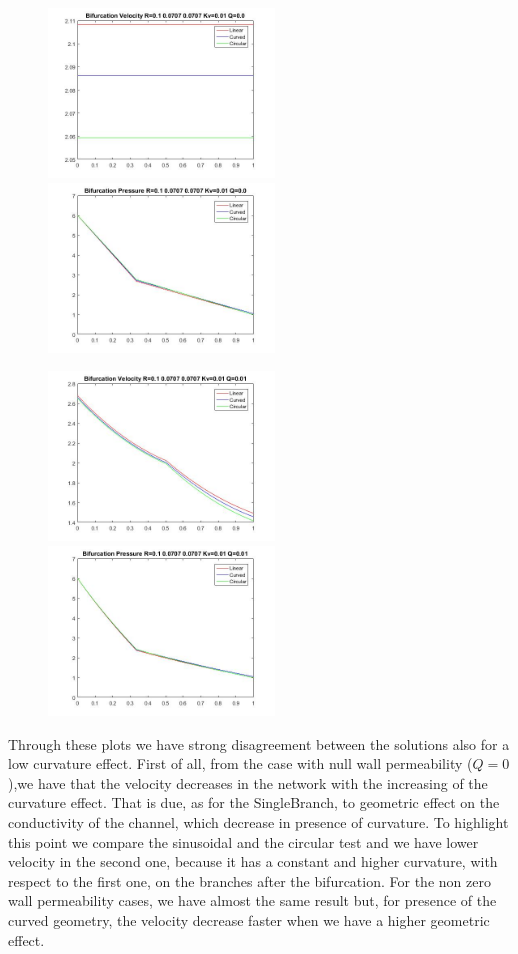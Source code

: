 \documentclass[a4paper]{report}
\begin{document}
\begin{figure}[htbp]
\centering
\includegraphics[width= 60mm]{Bifurcation_Velocity0}%
\qquad \qquad
\includegraphics[width= 60mm]{Bifurcation_Pressure0}
\end{figure}
\newpage
\begin{figure}[htbp]
\centering
\includegraphics[width= 60mm]{Bifurcation_Velocity1}%
\qquad \qquad
\includegraphics[width= 60mm]{Bifurcation_Pressure1}
\end{figure}
Through these plots we have strong disagreement between the solutions also for a low curvature effect. 
First of all, from the case with null wall permeability ($Q=0$),we have that the velocity decreases in the network with the increasing of the curvature effect. That is due, as for the SingleBranch, to geometric effect on the conductivity of the channel, which decrease in presence of curvature. To highlight this point we compare the sinusoidal and the circular test and we have lower velocity in the second one, because it has a constant and higher curvature, with respect to the first one, on the branches after the bifurcation. For the non zero wall permeability cases, we have almost the same result but, for presence of the curved geometry, the velocity decrease faster when we have a higher geometric effect.\\
\end{document}
